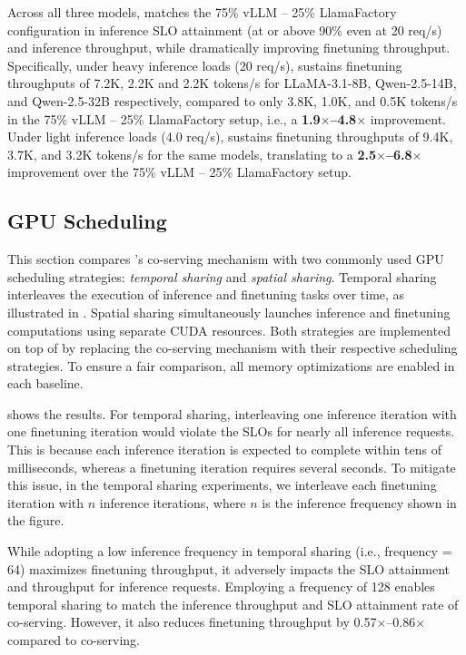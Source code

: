 Across all three models, \FlexLLM matches the 75\% vLLM -- 25\% LlamaFactory configuration in inference SLO attainment (at or above 90\% even at 20 req/s) and inference throughput, while dramatically improving finetuning throughput. Specifically, under heavy inference loads (20 req/s), \FlexLLM sustains finetuning throughputs of 7.2K, 2.2K and 2.2K tokens/s for LLaMA-3.1-8B, Qwen-2.5-14B, and Qwen-2.5-32B respectively, compared to only 3.8K, 1.0K, and 0.5K tokens/s in the 75\% vLLM -- 25\% LlamaFactory setup, i.e., a \textbf{1.9$\times$--4.8$\times$} improvement. Under light inference loads (4.0 req/s), \FlexLLM sustains finetuning throughputs of 9.4K, 3.7K, and 3.2K tokens/s for the same models, translating to a \textbf{2.5$\times$--6.8$\times$} improvement over the 75\% vLLM -- 25\% LlamaFactory setup.

\subsection{GPU Scheduling}
\label{flexllm:sec:exp:scheduling}

This section compares \FlexLLM's co-serving mechanism with two commonly used GPU scheduling strategies: {\em temporal sharing} and {\em spatial sharing}.
Temporal sharing interleaves the execution of inference and finetuning tasks over time, as illustrated in . Spatial sharing simultaneously launches inference and finetuning computations using separate CUDA resources. Both strategies are implemented on top of \FlexLLM by replacing the co-serving mechanism with their respective scheduling strategies. To ensure a fair comparison, all memory optimizations are enabled in each baseline.

 shows the results. For temporal sharing, interleaving one inference iteration with one finetuning iteration would violate the SLOs for nearly all inference requests.
This is because each inference iteration is expected to complete within tens of milliseconds, whereas a finetuning iteration requires several seconds. To mitigate this issue, in the temporal sharing experiments, we interleave each finetuning iteration with $n$ inference iterations, where $n$ is the inference frequency shown in the figure.

While adopting a low inference frequency in temporal sharing (i.e., frequency = 64) maximizes finetuning throughput, it adversely impacts the SLO attainment and throughput for inference requests.
Employing a frequency of 128 enables temporal sharing to match the inference throughput and SLO attainment rate of co-serving. However, it also reduces finetuning throughput by 0.57$\times$--0.86$\times$ compared to co-serving.

